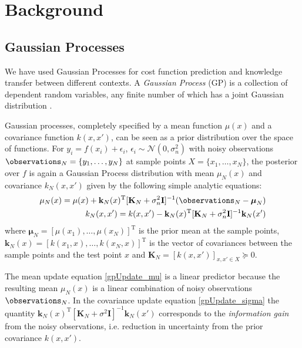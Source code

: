 \section{Background}\label{sec:bground}
\subsection{Gaussian Processes}\label{GPIntro}
We have used Gaussian Processes for cost function prediction and knowledge transfer between different contexts. A \textit{Gaussian Process} (GP) is a collection of dependent random variables, any finite number of which has a joint Gaussian distribution \cite{Rasmussen06}. 

Gaussian processes, completely specified by a mean function $\mu(x)$ and a covariance function $k(x,x')$, can be seen as a prior distribution over the space of functions. For $y_i = f(x_i) + \epsilon_i$, $\epsilon_i \sim \mathcal{N}(0,\sigma_{n}^{2})$ with noisy observations $\observations_{N} = \{y_1,\ldots,y_N\}$ at sample points $X = \{x_1,\ldots,x_N\}$, the posterior over $f$ is again a Gaussian Process distribution with mean $\mu_N{(x)}$ and covariance $k_N(x,x')$ given by the following simple analytic equations:
\begin{align}
\mu_N{(x)} = \mu(x) + \mathbf{k}_N(x)^{\mathrm{T}}[\mathbf{K}_N + \sigma_{n}^{2}\mathbf{I}]^{-1}(\observations_N - \boldsymbol{\mu}_N) \label{gpUpdate_mu} \\ 
k_N(x,x') = k(x,x') - \mathbf{k}_N(x)^{\mathrm{T}}[\mathbf{K}_N + \sigma_{n}^{2}\mathbf{I}]^{-1} \mathbf{k}_N(x') \label{gpUpdate_sigma}
\end{align}
where $\boldsymbol{\mu}_N = [\mu(x_1),\ldots,\mu(x_N)]^\mathrm{T}$ is the prior mean at the sample points, $\mathbf{k}_N(x) = [k(x_1,x),\ldots,k(x_N,x)]^\mathrm{T}$ is the vector of covariances between the sample points and the test point $x$ and $\mathbf{K}_N = [k(x,x')]_{x,x' \in X} \succeq 0.$

The mean update equation \eqref{gpUpdate_mu} is a linear predictor because the resulting mean $\mu_N{(x)}$ is a linear combination of noisy observations $\observations_N$. In the covariance update equation \eqref{gpUpdate_sigma} the quantity $\mathbf{k}_N(x)^{\mathrm{T}}[\mathbf{K}_N + \sigma^{2}\mathbf{I}]^{-1} \mathbf{k}_N(x')$ corresponds to the \emph{information gain} from the noisy observations, i.e. reduction in uncertainty from the prior covariance $k(x,x')$.

